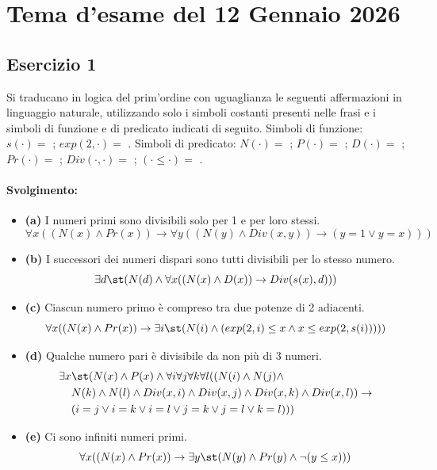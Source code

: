 \section{Tema d'esame del 12 Gennaio 2026}
\subsection*{Esercizio 1}


Si traducano in logica del prim'ordine con uguaglianza le seguenti affermazioni in linguaggio naturale, utilizzando solo i simboli costanti presenti nelle frasi e i simboli di funzione e di predicato indicati di seguito. Simboli di funzione: \(s(\cdot) = \) ; \(exp(2,\cdot) = \) . Simboli di predicato: \(N(\cdot) = \) ; \(P(\cdot) = \) ; \(D(\cdot) = \) ; \(Pr(\cdot) = \) ; \(Div(\cdot,\cdot) = \) ; \((\cdot \le \cdot) = \) .
\paragraph{Svolgimento:}
\begin{itemize}
    \item \textbf{(a)} I numeri primi sono divisibili solo per 1 e per loro stessi.
    \[\forall x ((N(x) \land Pr(x)) \to \forall y ((N(y) \land Div(x,y)) \to (y=1 \lor y=x)))\]

    \item \textbf{(b)} I successori dei numeri dispari sono tutti divisibili per lo stesso numero.
    \[\exists d \st (N(d) \land \forall x ((N(x) \land D(x)) \to Div(s(x), d)))\]

    \item \textbf{(c)} Ciascun numero primo è compreso tra due potenze di 2 adiacenti.
    \[\forall x ((N(x) \land Pr(x)) \to \exists i \st (N(i) \land (exp(2,i) \le x \land x \le exp(2,s(i)))))\]

    \item \textbf{(d)} Qualche numero pari è divisibile da non più di 3 numeri.
    \[
    \begin{aligned}
      \exists x& \st (N(x) \land P(x) \land \forall i \forall j \forall k \forall l ((N(i) \land N(j) \land \\
      & N(k) \land N(l) \land Div(x,i) \land Div(x,j) \land Div(x,k) \land Div(x,l)) \to\\
      & (i=j \lor i=k \lor i=l \lor j=k \lor j=l \lor k=l)))
    \end{aligned}
    \]

    \item \textbf{(e)} Ci sono infiniti numeri primi.
    \[\forall x ((N(x) \land Pr(x)) \to \exists y \st (N(y) \land Pr(y) \land \neg(y \le x)))\]
\end{itemize}


